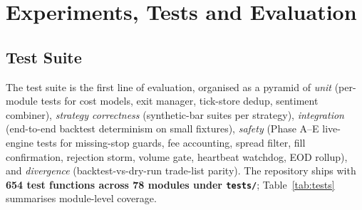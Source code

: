 \documentclass[a4paper, 12pt, titlepage]{article}
\begin{document}
\newpage
\section{Experiments, Tests and Evaluation}

\subsection{Test Suite}

The test suite is the first line of evaluation, organised as a
pyramid of \emph{unit} (per-module tests for cost models, exit
manager, tick-store dedup, sentiment combiner), \emph{strategy
correctness} (synthetic-bar suites per strategy),
\emph{integration} (end-to-end backtest determinism on small
fixtures), \emph{safety} (Phase A--E live-engine tests for
missing-stop guards, fee accounting, spread filter, fill
confirmation, rejection storm, volume gate, heartbeat watchdog,
EOD rollup), and \emph{divergence} (backtest-vs-dry-run trade-list
parity). The repository ships with \textbf{654 test functions
across 78 modules under \texttt{tests/}}; Table~\ref{tab:tests}
summarises module-level coverage.
\end{document}
